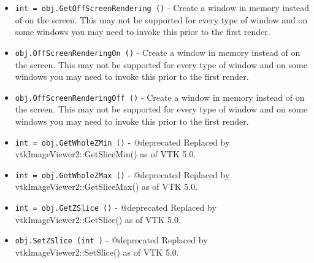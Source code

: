 \begin{itemize}
\item  \verb|int = obj.GetOffScreenRendering ()| -  Create a window in memory instead of on the screen. This may not
 be supported for every type of window and on some windows you may
 need to invoke this prior to the first render.

\item  \verb|obj.OffScreenRenderingOn ()| -  Create a window in memory instead of on the screen. This may not
 be supported for every type of window and on some windows you may
 need to invoke this prior to the first render.

\item  \verb|obj.OffScreenRenderingOff ()| -  Create a window in memory instead of on the screen. This may not
 be supported for every type of window and on some windows you may
 need to invoke this prior to the first render.

\item  \verb|int = obj.GetWholeZMin ()| -  @deprecated Replaced by vtkImageViewer2::GetSliceMin() as of VTK 5.0.

\item  \verb|int = obj.GetWholeZMax ()| -  @deprecated Replaced by vtkImageViewer2::GetSliceMax() as of VTK 5.0.

\item  \verb|int = obj.GetZSlice ()| -  @deprecated Replaced by vtkImageViewer2::GetSlice() as of VTK 5.0.

\item  \verb|obj.SetZSlice (int )| -  @deprecated Replaced by vtkImageViewer2::SetSlice() as of VTK 5.0.

\end{itemize}
